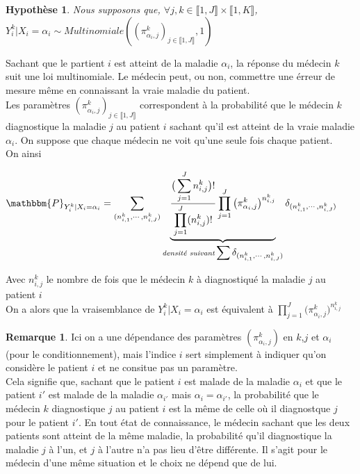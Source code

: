 \documentclass[frenchb]{report}
\newcommand{\1}{\mathbbm{1}}
\newcommand{\prob}{\mathbbm{P}}
\newtheorem{hyp}{Hypothèse}
\theoremstyle{definition}\newtheorem{defn}{Définition}
\theoremstyle{definition}\newtheorem{exm}{Exemple}
\theoremstyle{definition}\newtheorem{nota}{Notation}
\theoremstyle{definition}\newtheorem{rem}{Remarque}
\begin{document}
\begin{hyp}
	Nous supposons que, $\forall j,k \in \llbracket 1,J \rrbracket \times \llbracket 1,K \rrbracket$, $Y^k_i | X_i = \alpha_i \sim Multinomiale((\pi^k_{\alpha_i,j})_{j \in \llbracket 1,J \rrbracket},1)$
\end{hyp}

Sachant que le partient $i$ est atteint de la maladie $\alpha_i$, la réponse du médecin $k$ suit une loi multinomiale. Le médecin peut, ou non, commettre une érreur de mesure même en connaissant la vraie maladie du patient. \\

Les paramètres $(\pi^k_{\alpha_i,j})_{j \in \llbracket 1,J \rrbracket}$ correspondent à la probabilité que le médecin $k$ diagnostique la maladie $j$ au patient $i$ sachant qu'il est atteint de la vraie maladie $\alpha_i$. On suppose que chaque médecin ne voit qu'une seule fois chaque patient.\\

On ainsi
\begin{center}
$\prob_{Y^k_i|X_i = \alpha_i} = \displaystyle \sum_{(n^k_{i,1}, \cdots, n^k_{i,J})} \underbrace{\frac{\big(\displaystyle \sum_{j=1}^J n^k_{i,j}\big)!}{\displaystyle \prod_{j=1}^J (n^k_{i,j})!}\displaystyle \prod_{j=1}^J \big(\pi^k_{\alpha_i,j}\big)^{n^k_{i,j}}}_{\textit{densité suivant} \displaystyle \sum \delta_{(n^k_{i,1}, \cdots, n^k_{i,J})}} \delta_{(n^k_{i,1}, \cdots, n^k_{i,J})}$
\end{center}

Avec $n^k_{i,j}$ le nombre de fois que le médecin $k$ à diagnostiqué la maladie $j$ au patient $i$\\

On a alors que la vraisemblance de $Y^k_i | X_i = \alpha_i$ est équivalent à $\displaystyle \prod_{j=1}^J \big(\pi^k_{\alpha_i,j}\big)^{n^k_{i,j}}$\\


\begin{rem}
	Ici on a une dépendance des paramètres $(\pi^k_{\alpha_i,j})$ en $k$,$j$ et $\alpha_i$ (pour le conditionnement), mais l'indice $i$ sert simplement à indiquer qu'on considère le patient $i$ et ne consitue pas un paramètre.\\
	Cela signifie que, sachant que le patient $i$ est malade de la maladie $\alpha_i$ et que le patient $i'$ est malade de la maladie $\alpha_{i'}$ mais $\alpha_i = \alpha_{i'}$, la probabilité que le médecin $k$ diagnostique $j$ au patient $i$ est la même de celle où il diagnostque $j$ pour le patient $i'$. 
	En tout état de connaissance, le médecin sachant que les deux patients sont atteint de la même maladie, la probabilité qu'il diagnostique la maladie $j$ à l'un, et $j$ à l'autre n'a pas lieu d'être différente. Il s'agit pour le médecin d'une même situation et le choix ne dépend que de lui. 
\end{rem}
\bigskip
\end{document}
